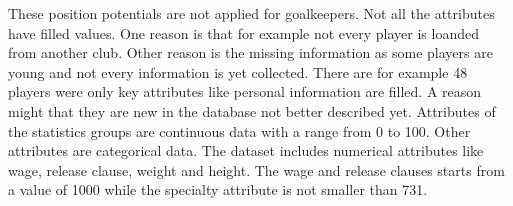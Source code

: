 These position potentials are not applied for goalkeepers.
Not all the attributes have filled values. One reason is that for example not every player is loanded from another club. Other reason is the missing information as some players are young and not every information is yet collected. There are for example 48 players were only key attributes like personal information are filled. A reason might that they are new in the database not better described yet. \newline
Attributes of the statistics groups are continuous data with a range from 0 to 100. Other attributes are categorical data. The dataset includes numerical attributes like wage, release clause, weight and height. \newline
The wage and release clauses starts from a value of 1000 while the specialty attribute is not smaller than 731. 